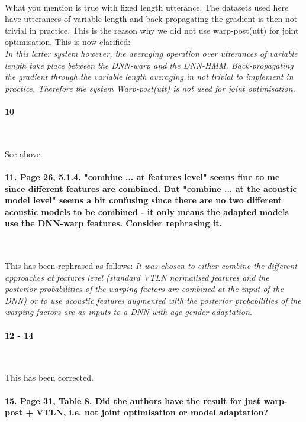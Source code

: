 \documentclass[]{article}
\begin{document}
~

What you mention is true with fixed length utterance. The datasets used here have utterances of variable length and back-propagating the gradient is then not trivial in practice. This is the reason why we did not use warp-post(utt) for joint optimisation. This is now clarified:\\
\textit{In this latter system however, the averaging operation over utterances of variable length take place between the DNN-warp and the DNN-HMM. Back-propagating the gradient through the variable length averaging in not trivial to implement in practice. Therefore the system \textit{Warp-post(utt)} is not used for joint optimisation.}

\paragraph{10}

~

See above.

\paragraph{11. Page 26, 5.1.4. "combine ... at features level" seems fine to me since different features are combined. But "combine ... at the acoustic model level" seems a bit confusing since there are no two different acoustic models to be combined - it only means the adapted models use the DNN-warp features. Consider rephrasing it.}

~

This has been rephrased as follows:
\textit{It was chosen to either combine the different approaches at features level (standard VTLN normalised features and the posterior probabilities of the warping factors are combined at the input of the DNN) or to use acoustic features augmented with the posterior probabilities of the warping factors are as inputs to a DNN with age-gender adaptation.}

\paragraph{12 - 14}

~

This has been corrected.

\paragraph{15. Page 31, Table 8. Did the authors have the result for just warp-post + VTLN, i.e. not joint optimisation or model adaptation?}
\end{document}
